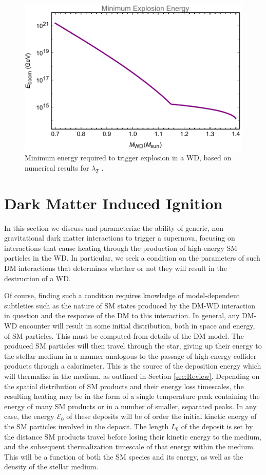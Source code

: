 \documentclass[twocolumn,showpacs,preprintnumbers,amsmath,amssymb,prd]{revtex4}
\begin{document}
\begin{figure}
\includegraphics[scale=.45]{Eboom.pdf}
\caption{Minimum energy required to trigger explosion in a WD, based on numerical results for $\lambda_T$ \cite{Woosley}.}
\label{fig:Eboom}
\end{figure}

\section{Dark Matter Induced Ignition}
\label{sec:DMexplode}

In this section we discuss and parameterize the ability of generic, non-gravitational dark matter interactions to trigger a supernova, focusing on interactions that cause heating through the production of high-energy SM particles in the WD. In particular, we seek a condition on the parameters of such DM interactions that determines whether or not they will result in the destruction of a WD.

Of course, finding such a condition requires knowledge of model-dependent subtleties such as the nature of SM states produced by the DM-WD interaction in question and the response of the DM to this interaction.  In general, any DM-WD encounter will result in some initial distribution, both in space and energy, of SM particles. This must be computed from details of the DM model.  The produced SM particles will then travel through the star, giving up their energy to the stellar medium in a manner analogous to the passage of high-energy collider products through a calorimeter.  This is the source of the deposition energy which will thermalize in the medium, as outlined in Section \ref{sec:Review}.  Depending on the spatial distribution of SM products and their energy loss timescales, the resulting heating may be in the form of a single temperature peak containing the energy of many SM products or in a number of smaller, separated peaks.  In any case, the energy $\mathcal{E}_0$ of these deposits will be of order the initial kinetic energy of the SM particles involved in the deposit.  The length $L_0$ of the deposit is set by the distance SM products travel before losing their kinetic energy to the medium, and the subsequent thermalization timescale of that energy within the medium.  This will be a function of both the SM species and its energy, as well as the density of the stellar medium.
\end{document}
